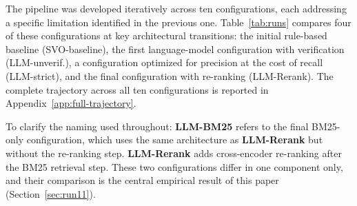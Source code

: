 \documentclass[10pt]{article}
\begin{document}
The pipeline was developed iteratively across ten configurations,
each addressing a specific limitation identified in the previous
one.
Table~\ref{tab:runs} compares four of these configurations at key
architectural transitions: the initial rule-based baseline (SVO-baseline),
the first language-model configuration with verification (LLM-unverif.),
a configuration optimized for precision at the cost of recall (LLM-strict),
and the final configuration with re-ranking (LLM-Rerank).
The complete trajectory across all ten configurations is reported
in Appendix~\ref{app:full-trajectory}.

To clarify the naming used throughout: \textbf{LLM-BM25} refers to the final
BM25-only configuration, which uses the same architecture as
\textbf{LLM-Rerank} but without the re-ranking step.
\textbf{LLM-Rerank} adds cross-encoder re-ranking after the
BM25 retrieval step.
These two configurations differ in one component only, and their
comparison is the central empirical result of this paper
(Section~\ref{sec:run11}).
\end{document}
